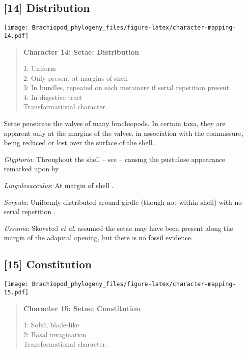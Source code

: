 \documentclass[openany]{book}
\theoremstyle{definition}
\theoremstyle{definition}
\theoremstyle{definition}
\theoremstyle{remark}
\begin{document}
\subsection*{{[}14{]} Distribution}\label{distribution}

\texttt{[image: Brachiopod\_phylogeny\_files/figure-latex/character-mapping-14.pdf]}

\begin{quote}
\textbf{Character 14: Setae: Distribution}

1: Uniform\\
2: Only present at margins of shell\\
3: In bundles, repeated on each metamere if serial repetition present\\
4: In digestive tract\\
Transformational character.
\end{quote}

Setae penetrate the valves of many brachiopods. In certain taxa, they
are apparent only at the margins of the valves, in association with the
commissure, being reduced or lost over the surface of the shell.

\hypertarget{Glyptoria-coding-14}{}
\emph{Glyptoria}: Throughout the shell -- see
\citet{Williams2007Supplement} -- causing the pustulose appearance
remarked upon by \citet{Chen2007Reinterpretationof}.

\hypertarget{Lingulosacculus-coding-14}{}
\emph{Lingulosacculus}: At margin of shell \citep{Zhang2005}.

\hypertarget{Serpula-coding-14}{}
\emph{Serpula}: Uniformly distributed around girdle (though not within
shell) with no serial repetition \citep{Vinther2005, Leise1988}.

\hypertarget{Ussunia-coding-14}{}
\emph{Ussunia}: Skovsted \emph{et al}.
\citeyearpar{Skovsted2011Scleritomeconstruction} assumed the setae may
have been present along the margin of the adapical opening, but there is
no fossil evidence.

\subsection*{{[}15{]} Constitution}\label{constitution}

\texttt{[image: Brachiopod\_phylogeny\_files/figure-latex/character-mapping-15.pdf]}

\begin{quote}
\textbf{Character 15: Setae: Constitution}

1: Solid, blade-like\\
2: Basal invagination\\
Transformational character.
\end{quote}
\end{document}
